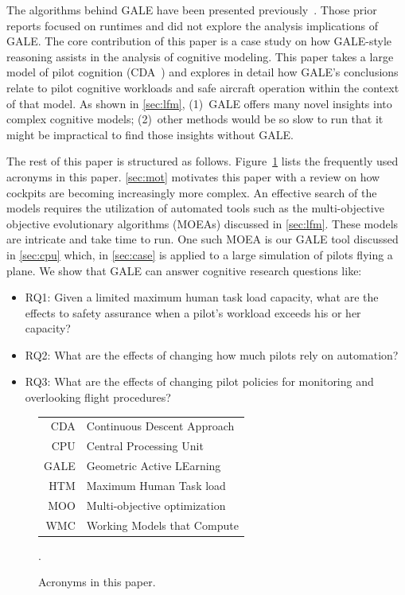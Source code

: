 \documentclass[journal]{IEEEtran}
\newcommand{\tion}[1]{\textsection\ref{sec:#1}}
\newcommand{\fig}[1]{Figure~\ref{fig:#1}}
\begin{document}
The algorithms behind GALE have been presented previously~\cite{krall14aaai,krallphd,galepaper}.
 Those prior reports  focused on runtimes and did not explore the analysis implications of GALE.
The core contribution of this paper is a case study on how GALE-style reasoning assists 
in the analysis of cognitive modeling.
This paper takes a large model of pilot cognition (CDA~\cite{Kim2011,Pritchett2011,Feigh2012,Kim2013,Pritchett2013}) 
and explores in detail how GALE's conclusions relate to pilot cognitive workloads and safe aircraft operation within the context of that model.
As shown in \tion{lfm}, (1)~GALE offers many novel insights into complex cognitive models; (2)~other methods would be so slow to run that it might be impractical to find those insights without GALE.


The rest of this  paper is structured as follows.
\fig{acronyms} lists the frequently used acronyms in this paper.
\tion{mot} motivates this paper with a review on how cockpits are becoming increasingly more complex. 
An effective search of the models requires the utilization of automated tools such as the multi-objective objective evolutionary algorithms (MOEAs) discussed in \tion{lfm}.
These models are intricate and take time to run. 
One such MOEA is our GALE tool discussed in \tion{cpu} which, in \tion{case} is applied to a large simulation
of pilots flying a plane.
We show that GALE can answer cognitive research questions like:
\begin{itemize}
\item RQ1:  Given a limited maximum human task load capacity, what are the effects to safety assurance when a pilot's workload exceeds his or her capacity?
\item RQ2:  What are the effects of changing how much pilots rely on automation?
\item RQ3: What are the effects of changing pilot policies for monitoring and overlooking flight procedures? 
\end{itemize}



\begin{figure}[!b]
\small\begin{tabular}{r@{~=~}l}
CDA&Continuous Descent Approach\\
CPU & Central Processing Unit\\
GALE& Geometric Active LEarning\\
HTM&Maximum Human Task load\\
MOO& Multi-objective optimization\\
WMC& Working Models that Compute
\end{tabular}
\caption{Acronyms in this paper.}\label{fig:acronyms}.
\end{figure}
\end{document}
